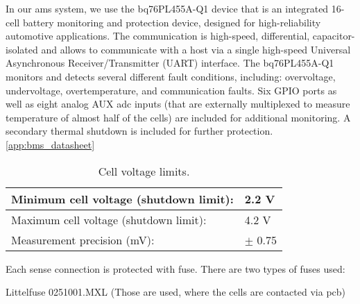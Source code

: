 In our \gls{ams} system, we use the bq76PL455A-Q1 device that is an integrated 16-cell battery monitoring and protection device, designed for high-reliability automotive applications. The communication is high-speed, differential, capacitor-isolated and allows to communicate with a host via a single high-speed Universal Asynchronous Receiver/Transmitter (UART) interface.
The bq76PL455A-Q1 monitors and detects several different fault conditions, including: overvoltage, undervoltage, overtemperature, and communication faults. Six GPIO ports as well as eight analog AUX \gls{adc} inputs (that are externally multiplexed to measure temperature of almost half of the cells) are included for additional monitoring. A secondary thermal shutdown is included for further protection. \ref{app:bms_datasheet}

\begin{table}[H]
	\centering
	\caption{Cell voltage limits.}
	\begin{tabu}{|X|X|}
		\hline
		Minimum cell voltage (shutdown limit): & 2.2 V \\
		\hline
		Maximum cell voltage (shutdown limit): & 4.2 V \\
		\hline
		Measurement precision (mV): & $\pm$ 0.75 \\
		\hline
	\end{tabu}%
	\label{tab:acc-limits}%
\end{table}%


Each sense connection is protected with fuse. There are two types of fuses used: 

\noindent Littelfuse 0251001.MXL (Those are used, where the cells are contacted via \gls{pcb})

